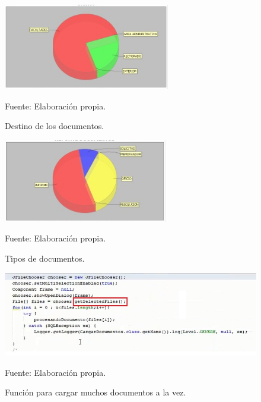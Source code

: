 \begin{figure}[h!]
	\centering
		\includegraphics[scale=1]{imagenes/DestinosDeDocumentos.png}
		\caption{Destino de los documentos.}
		\begin{center}
    Fuente: Elaboración propia.
    \end{center}
	\label{fig:DestinosDeDocumentos}
\end{figure}

\begin{figure}[h!]
	\centering
		\includegraphics[scale=1]{imagenes/ReporteDocumentos.png}
		\caption{Tipos de documentos.}
		\begin{center}
    Fuente: Elaboración propia.
    \end{center}
	\label{fig:ReporteDocumentos}
\end{figure}

\begin{figure}[h!]
	\centering
		\includegraphics[scale=0.7]{imagenes/CargaDocumentos.jpeg}
		\caption{Función para cargar muchos documentos a la vez.}
	\begin{center}
    Fuente: Elaboración propia.
    \end{center}
	\label{fig:CargarDocumentos}
\end{figure}

